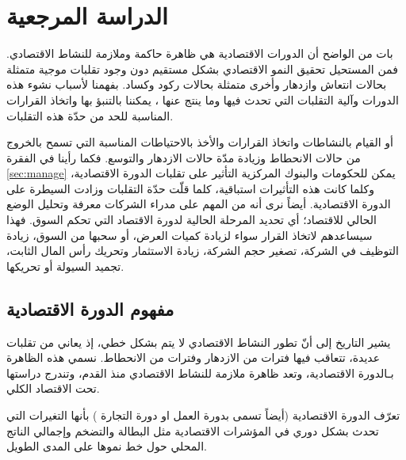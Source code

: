 
\chapter{الدراسة المرجعية}
بات من الواضح أن الدورات الاقتصادية هي ظاهرة حاكمة وملازمة للنشاط الاقتصادي. فمن المستحيل تحقيق النمو الاقتصادي بشكل مستقيم دون وجود تقلبات موجية متمثلة بحالات
انتعاش وازدهار وأخرى متمثلة بحالات ركود وكساد. بفهمنا لأسباب نشوء هذه الدورات وآلية التقلبات التي تحدث فيها
\parencite{10:mvcp}
وما ينتج عنها \cite{1:misp}، يمكننا بالتنبؤ بها واتخاذ القرارات المناسبة للحد
من حدّة هذه التقلبات.  \cite{wolfram:mvc}

أو القيام بالنشاطات واتخاذ القرارات والأخذ بالاحتياطات المناسبة التي تسمح بالخروج من حالات الانحطاط وزيادة مدّة حالات الازدهار والتوسع.
فكما رأينا في الفقرة \ref{sec:manage} يمكن للحكومات والبنوك المركزية التأثير على تقلبات الدورة الاقتصادية، وكلما كانت هذه التأثيرات استباقية، كلما قلّت حدّة التقلبات
وزادت السيطرة على الدورة الاقتصادية. \cite{shamoon}
أيضاً نرى أنه من المهم على مدراء الشركات معرفة وتحليل الوضع الحالي للاقتصاد؛ أي تحديد المرحلة الحالية لدورة الاقتصاد التي تحكم السوق. فهذا سيساعدهم لاتخاذ القرار
سواء لزيادة كميات العرض، أو سحبها من السوق، زيادة التوظيف في الشركة، تصغير حجم الشركة، زيادة الاستثمار وتحريك رأس المال الثابت، تجميد السيولة أو تحريكها.

\section{مفهوم الدورة الاقتصادية}
يشير التاريخ إلى أنّ تطور النشاط الاقتصادي لا يتم بشكل خطي، إذ يعاني من تقلبات عديدة، تتعاقب فيها فترات من الازدهار وفترات من الانحطاط.
نسمي هذه الظاهرة بـالدورة الاقتصادية، وتعد ظاهرة ملازمة للنشاط الاقتصادي منذ القدم، وتندرج دراستها تحت الاقتصاد الكلي.

تعرّف الدورة الاقتصادية  
(أيضاً تسمى بدورة العمل  او دورة التجارة ) 
بأنها التغيرات التي تحدث بشكل دوري في المؤشرات الاقتصادية 
مثل البطالة والتضخم وإجمالي الناتج المحلي حول خط نموها على المدى الطويل.

